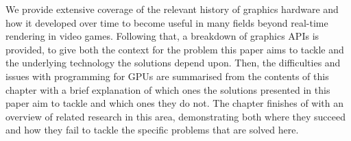 \documentclass[a4paper,12pt,twoside,openright]{report}
\begin{document}


We provide extensive coverage of the relevant history of graphics hardware and
how it developed over time to become useful in many fields beyond real-time
rendering in video games. Following that, a breakdown of graphics APIs is
provided, to give both the context for the problem this paper aims to tackle
and the underlying technology the solutions depend upon. Then, the difficulties
and issues with programming for GPUs are summarised from the contents of this
chapter with a brief explanation of which ones the solutions presented in this
paper aim to tackle and which ones they do not. The chapter finishes of with an
overview of related research in this area, demonstrating both where they
succeed and how they fail to tackle the specific problems that are solved here.





\end{document}
